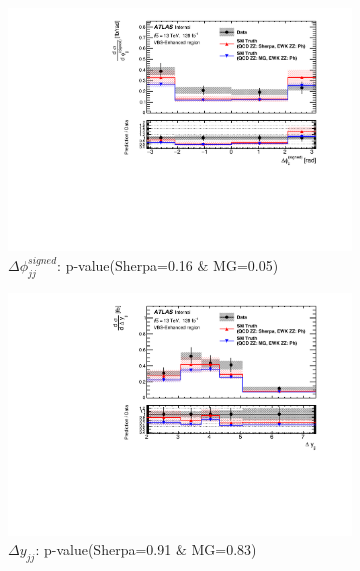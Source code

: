 \begin{figure}[!htb]
\begin{subfigure}{.49\textwidth}
        \centering
        \includegraphics[width=.98\linewidth]{figures/Results/CrossSection_VBSEnhanced/xs_dphi_SR.pdf}
        \caption{ \footnotesize{$\Delta \phi _{jj}^{signed}$: p-value(Sherpa=0.16 $\&$ MG=0.05)} }
    \end{subfigure}
    \begin{subfigure}{.49\textwidth}
        \centering
        \includegraphics[width=.98\linewidth]{figures/Results/CrossSection_VBSEnhanced/xs_dy_SR.pdf}
        \caption{ \footnotesize{$\Delta y_{jj}$: p-value(Sherpa=0.91 $\&$ MG=0.83)} }
    \end{subfigure}\\
    \begin{subfigure}{.49\textwidth}
        \centering

\end{subfigure}
\end{figure}
